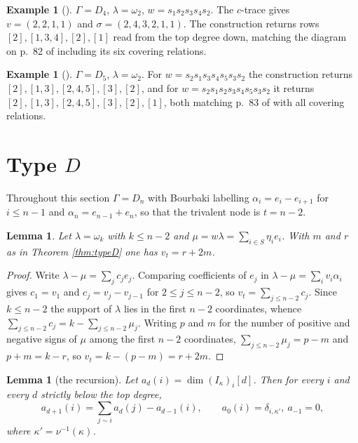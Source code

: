 \documentclass[11pt,reqno]{amsart}
\theoremstyle{plain}
\newtheorem{lemma}[theorem]{Lemma}
\theoremstyle{definition}
\newtheorem{example}[theorem]{Example}
\newcommand{\al}{\alpha}
\newcommand{\om}{\omega}
\newcommand{\la}{\lambda}
\newcommand{\ka}{\kappa}
\begin{document}
\begin{example}[{\cite[Ex.~5.10]{DKK}}]
$\Gamma=D_4$, $\la=\om_2$, $w=s_1s_2s_3s_4s_2$.  The $c$-trace gives
$v=(2,2,1,1)$ and $\sigma=(2,4,3,2,1,1)$.  The construction returns rows
$[2],[1,3,4],[2],[1]$ read from the top degree down, matching the diagram on
p.~82 of \cite{DKK} including its six covering relations.
\end{example}

\begin{example}[{\cite[Ex.~5.11, Ex.~5.12]{DKK}}]
$\Gamma=D_5$, $\la=\om_2$.  For $w=s_2s_1s_3s_4s_5s_3s_2$ the construction
returns $[2],[1,3],[2,4,5],[3],[2]$, and for
$w=s_2s_1s_2s_3s_4s_5s_3s_2$ it returns $[2],[1,3],[2,4,5],[3],[2],[1]$, both
matching p.~83 of \cite{DKK} with all covering relations.
\end{example}

\section{Type \texorpdfstring{$D$}{D}}\label{sec:typeD}

Throughout this section $\Gamma=D_n$ with Bourbaki labelling
$\al_i=e_i-e_{i+1}$ for $i\le n-1$ and $\al_n=e_{n-1}+e_n$, so that the
trivalent node is $t=n-2$.

\begin{lemma}\label{lem:C}
Let $\la=\om_k$ with $k\le n-2$ and $\mu=w\la=\sum_{i\in S}\eta_ie_i$.  With
$m$ and $r$ as in Theorem \ref{thm:typeD} one has $v_t=r+2m$.
\end{lemma}

\begin{proof}
Write $\la-\mu=\sum_jc_je_j$.  Comparing coefficients of $e_j$ in
$\la-\mu=\sum_iv_i\al_i$ gives $c_1=v_1$ and $c_j=v_j-v_{j-1}$ for
$2\le j\le n-2$, so $v_t=\sum_{j\le n-2}c_j$.  Since $k\le n-2$ the support of
$\la$ lies in the first $n-2$ coordinates, whence
$\sum_{j\le n-2}c_j=k-\sum_{j\le n-2}\mu_j$.  Writing $p$ and $m$ for the
number of positive and negative signs of $\mu$ among the first $n-2$
coordinates, $\sum_{j\le n-2}\mu_j=p-m$ and $p+m=k-r$, so
$v_t=k-(p-m)=r+2m$.
\end{proof}

\begin{lemma}[the recursion]\label{lem:R}
Let $a_d(i)=\dim (I_\ka)_i[d]$.  Then for every $i$ and every $d$ strictly
below the top degree,
\[
   a_{d+1}(i)=\sum_{j\sim i}a_d(j)-a_{d-1}(i),\qquad
   a_0(i)=\delta_{i,\ka'},\ a_{-1}=0,
\]
where $\ka'=\nu^{-1}(\ka)$.
\end{lemma}
\end{document}
